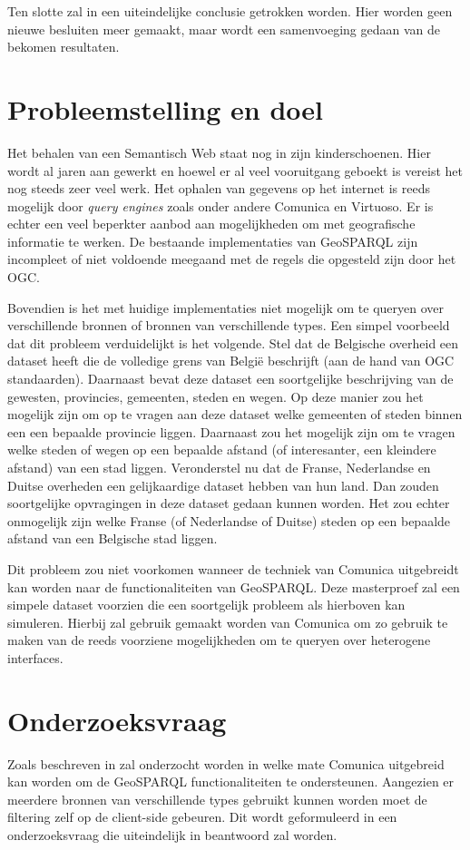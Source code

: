 Ten slotte zal in  een uiteindelijke conclusie getrokken worden. Hier worden geen nieuwe besluiten meer gemaakt, maar wordt een samenvoeging gedaan van de bekomen resultaten.


\section{Probleemstelling en doel}
\label{sec:probleemstelling_doel}
Het behalen van een Semantisch Web staat nog in zijn kinderschoenen. Hier wordt al jaren aan gewerkt en hoewel er al veel vooruitgang geboekt is vereist het nog steeds zeer veel werk. Het ophalen van gegevens op het internet is reeds mogelijk door \textit{query engines} zoals onder andere Comunica en Virtuoso. Er is echter een veel beperkter aanbod aan mogelijkheden om met geografische informatie te werken. De bestaande implementaties van GeoSPARQL zijn incompleet of niet voldoende meegaand met de regels die opgesteld zijn door het OGC. 

Bovendien is het met huidige implementaties niet mogelijk om te queryen over verschillende bronnen of bronnen van verschillende types. Een simpel voorbeeld dat dit probleem verduidelijkt is het volgende. Stel dat de Belgische overheid een dataset heeft die de volledige grens van België beschrijft (aan de hand van OGC standaarden). Daarnaast bevat deze dataset een soortgelijke beschrijving van de gewesten, provincies, gemeenten, steden en wegen. Op deze manier zou het mogelijk zijn om op te vragen aan deze dataset welke gemeenten of steden binnen een een bepaalde provincie liggen. Daarnaast zou het mogelijk zijn om te vragen welke steden of wegen op een bepaalde afstand (of interesanter, een kleindere afstand) van een stad liggen. Veronderstel nu dat de Franse, Nederlandse en Duitse overheden een gelijkaardige dataset hebben van hun land. Dan zouden soortgelijke opvragingen in deze dataset gedaan kunnen worden. Het zou echter onmogelijk zijn welke Franse (of Nederlandse of Duitse) steden op een bepaalde afstand van een Belgische stad liggen. 

Dit probleem zou niet voorkomen wanneer de techniek van Comunica uitgebreidt kan worden naar de functionaliteiten van GeoSPARQL. Deze masterproef zal een simpele dataset voorzien die een soortgelijk probleem als hierboven kan simuleren. Hierbij zal gebruik gemaakt worden van Comunica om zo gebruik te maken van de reeds voorziene mogelijkheden om te queryen over heterogene interfaces. 


\section{Onderzoeksvraag}
\label{sec:onderzoeksvraag}
Zoals beschreven in  zal onderzocht worden in welke mate Comunica uitgebreid kan worden om de GeoSPARQL functionaliteiten te ondersteunen. Aangezien er meerdere bronnen van verschillende types gebruikt kunnen worden moet de filtering zelf op de client-side gebeuren. Dit wordt geformuleerd in een onderzoeksvraag die uiteindelijk in  beantwoord zal worden. 

